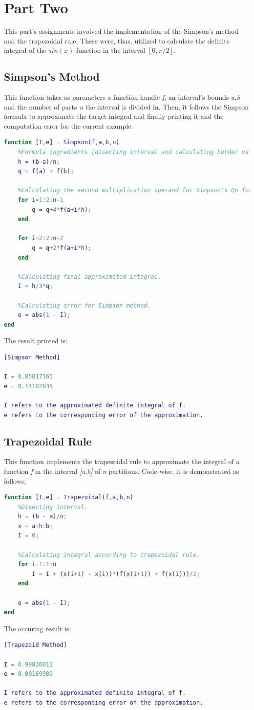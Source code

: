 \documentclass{article}
\begin{document}
\section{Part Two}
This part's assignments involved the implementation of the Simpson's method and the trapezoidal rule. These were, thus, utilized to calculate the definite integral of the $sin(x)$ function in the interval $[0,\pi/2]$.
\subsection{Simpson's Method}
This function takes as parameters a function handle \emph{f}, an interval's bounds \emph{a,b} and the number of parts \emph{n} the interval is divided in. Then, it follows the Simpson formula to approximate the target integral and finally printing it and the computation error for the current example.
\begin{lstlisting}[language=Matlab]
function [I,e] = Simpson(f,a,b,n)
    %Formula ingredients [disecting interval and calculating border values]
    h = (b-a)/n;
    q = f(a) + f(b);
   
    %Calculating the second multiplication operand for Simpson's Qn formula.
    for i=1:2:n-1
        q = q+4*f(a+i*h);
    end

    for i=2:2:n-2
        q = q+2*f(a+i*h);
    end
    
    %Calculating final approximated integral.
    I = h/3*q;

    %Calculating error for Simpson method.
    e = abs(1 - I);
end
\end{lstlisting}
\pagebreak
The result printed is;
\begin{lstlisting}[language=Matlab]
[Simpson Method]

I = 0.85817165
e = 0.14182835

I refers to the approximated definite integral of f.
e refers to the corresponding error of the approximation.
\end{lstlisting}
\subsection{Trapezoidal Rule}
This function implements the trapezoidal rule to approximate the integral of a function \emph{f} in the interval \emph{[a,b]} of \emph{n} partitions. Code-wise, it is demonstrated as follows;
\begin{lstlisting}[language=Matlab]
function [I,e] = Trapezoidal(f,a,b,n)
    %Disecting interval.
    h = (b - a)/n;
    x = a:h:b;
    I = 0;
    
    %Calculating integral according to trapezoidal rule.
    for i=1:1:n
        I = I + (x(i+1) - x(i))*(f(x(i+1)) + f(x(i)))/2;
    end
    
    e = abs(1 - I);
end
\end{lstlisting}
The occuring result is;
\begin{lstlisting}[language=Matlab]
[Trapezoid Method]

I = 0.99830011
e = 0.00169989

I refers to the approximated definite integral of f.
e refers to the corresponding error of the approximation.
\end{lstlisting}
\pagebreak
\end{document}
